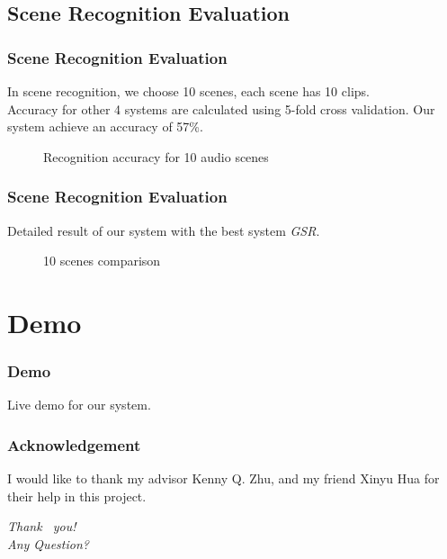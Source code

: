 \documentclass[xcolor=table,slidestop,compress,mathserif]{beamer}
\begin{document}
\subsection{Scene Recognition Evaluation}
\begin{frame}
	\frametitle{Scene Recognition Evaluation}
	In scene recognition, we choose 10 scenes, each scene has 10 clips. \\ 	
	Accuracy for other 4 systems are calculated using 5-fold cross validation. 
	Our system achieve an accuracy of 57\%.
	\begin{figure}[htb!]
	\centering
	\resizebox{0.8\totalheight}{!}{}
	\caption{Recognition accuracy for 10 audio scenes}
	\label{fig:sceneeval}
	\end{figure}
\end{frame}
\begin{frame}
	\frametitle{Scene Recognition Evaluation}
	Detailed result of our system with the best system \textit{GSR}. \\ 
	\begin{figure}[htb!]
	\centering
	\resizebox{0.8\totalheight}{!}{}
	\caption{10 scenes comparison}
	\label{fig:sceneeval}
	\end{figure}
\end{frame}
\section{Demo}
\begin{frame}
	\frametitle{Demo}
	Live demo for our system. 
\end{frame}
\begin{frame}
	\frametitle{Acknowledgement}
	I would like to thank my advisor Kenny Q. Zhu, and my friend Xinyu Hua for their help in this project. 
\end{frame}
\begin{frame}
  \begin{center}
    {\huge \emph{{Thank  ~you!
          \\   \vspace{1cm} Any Question?}}}
  \end{center}
\end{frame}
\end{document}
